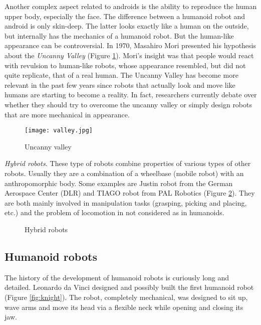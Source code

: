 Another complex aspect related to androids is the ability to reproduce the human upper body, especially the face. The difference between a humanoid robot and android is only skin-deep. The latter looks exactly like a human on the outside, but internally has the mechanics of a humanoid robot. But the human-like appearance can be controversial. In 1970, Masahiro Mori \cite{Mori2012} presented his hypothesis about the \textit{Uncanny Valley} (Figure \ref{fig:valley}). Mori's insight was that people would react with revulsion to human-like robots, whose appearance resembled, but did not quite replicate, that of a real human. The Uncanny Valley has become more relevant in the past few years since robots that actually look and move like humans are starting to become a reality. In fact, researchers currently debate over whether they should try to overcome the uncanny valley or simply design robots that are more mechanical in appearance.

\begin{figure}[!hbt]
\centering
\texttt{[image: valley.jpg]}
\caption{Uncanny valley}
\label{fig:valley}
\end{figure}


\textit{Hybrid robots.} These type  of robots combine properties of various types of other robots. Usually they are a combination of a wheelbase (mobile robot) with an anthropomorphic body. Some examples are Justin robot from the German Aerospace Center (DLR) and TIAGO robot from PAL Robotics (Figure \ref{fig:hybrid}). They are both mainly involved in manipulation tasks (grasping, picking and placing, etc.) and the problem of locomotion in not considered as in humanoids. 

\begin{figure}[!hbt]
\centering 
{}\hspace{10mm}
\caption{Hybrid robots}
\label{fig:hybrid}
\end{figure}

\newpage



\subsection{Humanoid robots}

The history of the development of humanoid robots is curiously long and detailed. Leonardo da Vinci designed and possibly built the first humanoid robot (Figure \ref{fig:knight}). The robot, completely mechanical, was designed to sit up, wave arms and move its head via a flexible neck while opening and closing its jaw. 


